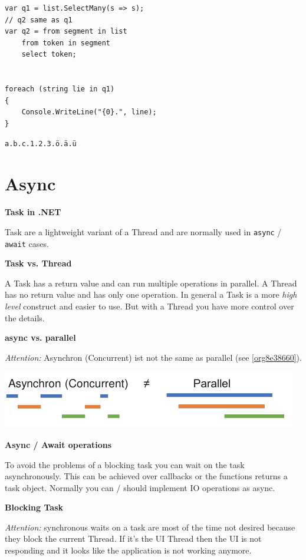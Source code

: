 \documentclass[11pt,twoside,landscape]{article}
\begin{document}
\begin{multicols}{3}
\begin{lstlisting}
var q1 = list.SelectMany(s => s);
// q2 same as q1
var q2 = from segment in list
    from token in segment
    select token;


foreach (string lie in q1)
{
    Console.WriteLine("{0}.", line);
}
\end{lstlisting}
\begin{verbatim}
a.b.c.1.2.3.ö.ä.ü
\end{verbatim}

\section{Async}
\label{sec:orgdaf7922}
\textbf{Task in .NET}

Task are a lightweight variant of a Thread and are normally used in \texttt{async} / \texttt{await} cases.

\textbf{Task vs. Thread}

A Task has a return value and can run multiple operations in parallel.
A Thread has no return value and has only one operation.
In general a Task is a more \emph{high level} construct and easier to use.
But with a Thread you have more control over the details.

\textbf{async vs. parallel}

\emph{Attention:} Asynchron (Concurrent) ist not the same as parallel (see \ref{org8e38660}).

\begin{center}
\includegraphics[width=.9\linewidth]{img/async_vs_concurrent.png}
\label{org8e38660}
\end{center}

\textbf{Async / Await operations}

To avoid the problems of a blocking task you can wait on the task asynchronously.
This can be achieved over callbacks or the functions returns a task object.
Normally you can / should implement IO operations as async.

\textbf{Blocking Task}

\emph{Attention:} synchronous waits on a task are most of the time not desired because they block the current Thread.
If it's the UI Thread then the UI is not responding and it looks like the application is not working anymore.



\end{multicols}
\end{document}
